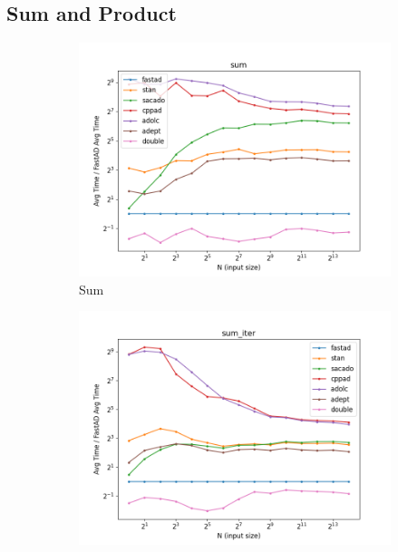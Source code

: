 \subsection{Sum and Product}\label{ssec:sum_prod}

\begin{figure}[t]
    \centering
    \begin{subfigure}[b]{0.475\textwidth}
        \centering
        \includegraphics[width=\textwidth]{figs/sum_fig.png}
        \caption{Sum}\label{fig:sum}
    \end{subfigure}
    \hfill
    \begin{subfigure}[b]{0.475\textwidth}
        \centering
        \includegraphics[width=\textwidth]{figs/sum_iter_fig.png}

\end{subfigure}
\end{figure}
